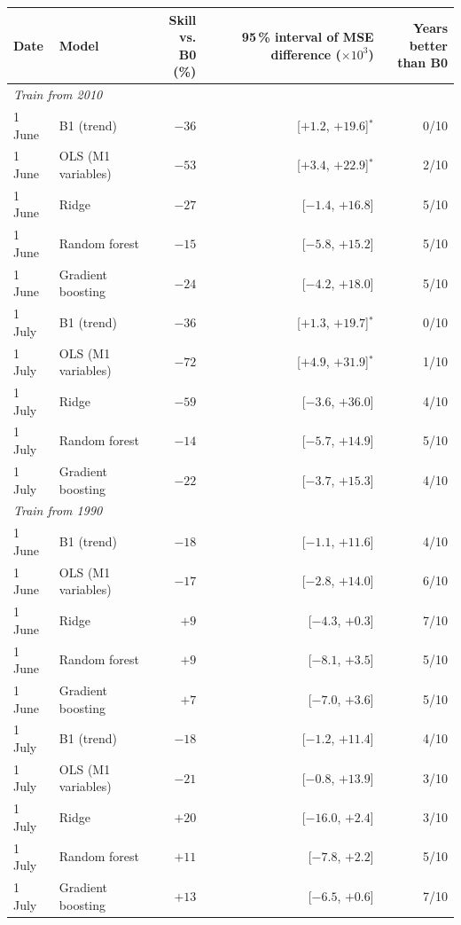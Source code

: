 \begin{tabular}{llrrr}
\toprule
Date & Model & \shortstack{Skill vs.\\B0 (\%)} & \shortstack{95\,\% interval of MSE\\difference ($\times 10^3$)} & \shortstack{Years better\\than B0} \\
\midrule
\multicolumn{5}{l}{\emph{Train from 2010}} \\
1 June & B1 (trend) & $-36$ & [$+1.2$, $+19.6$]$^*$ & 0/10 \\
1 June & OLS (M1 variables) & $-53$ & [$+3.4$, $+22.9$]$^*$ & 2/10 \\
1 June & Ridge & $-27$ & [$-1.4$, $+16.8$] & 5/10 \\
1 June & Random forest & $-15$ & [$-5.8$, $+15.2$] & 5/10 \\
1 June & Gradient boosting & $-24$ & [$-4.2$, $+18.0$] & 5/10 \\
1 July & B1 (trend) & $-36$ & [$+1.3$, $+19.7$]$^*$ & 0/10 \\
1 July & OLS (M1 variables) & $-72$ & [$+4.9$, $+31.9$]$^*$ & 1/10 \\
1 July & Ridge & $-59$ & [$-3.6$, $+36.0$] & 4/10 \\
1 July & Random forest & $-14$ & [$-5.7$, $+14.9$] & 5/10 \\
1 July & Gradient boosting & $-22$ & [$-3.7$, $+15.3$] & 4/10 \\
\multicolumn{5}{l}{\emph{Train from 1990}} \\
1 June & B1 (trend) & $-18$ & [$-1.1$, $+11.6$] & 4/10 \\
1 June & OLS (M1 variables) & $-17$ & [$-2.8$, $+14.0$] & 6/10 \\
1 June & Ridge & $+9$ & [$-4.3$, $+0.3$] & 7/10 \\
1 June & Random forest & $+9$ & [$-8.1$, $+3.5$] & 5/10 \\
1 June & Gradient boosting & $+7$ & [$-7.0$, $+3.6$] & 5/10 \\
1 July & B1 (trend) & $-18$ & [$-1.2$, $+11.4$] & 4/10 \\
1 July & OLS (M1 variables) & $-21$ & [$-0.8$, $+13.9$] & 3/10 \\
1 July & Ridge & $+20$ & [$-16.0$, $+2.4$] & 3/10 \\
1 July & Random forest & $+11$ & [$-7.8$, $+2.2$] & 5/10 \\
1 July & Gradient boosting & $+13$ & [$-6.5$, $+0.6$] & 7/10 \\
\bottomrule
\end{tabular}
